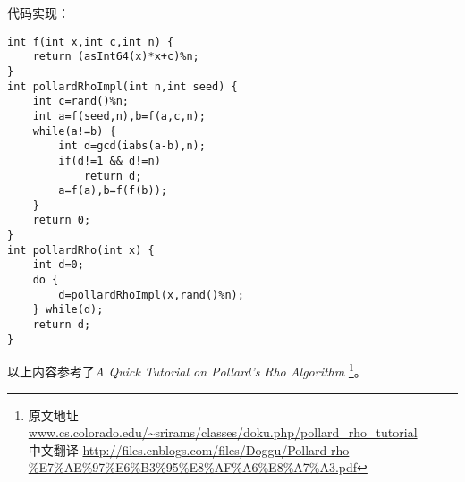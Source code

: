 代码实现：
\begin{lstlisting}[title=Pollard Rho]
int f(int x,int c,int n) {
    return (asInt64(x)*x+c)%n;
}
int pollardRhoImpl(int n,int seed) {
    int c=rand()%n;
    int a=f(seed,n),b=f(a,c,n);
    while(a!=b) {
        int d=gcd(iabs(a-b),n);
        if(d!=1 && d!=n)
            return d;
        a=f(a),b=f(f(b));
    }
    return 0;
}
int pollardRho(int x) {
    int d=0;
    do {
        d=pollardRhoImpl(x,rand()%n);
    } while(d);
    return d;
}
\end{lstlisting}

以上内容参考了\emph{A Quick Tutorial on Pollard's Rho Algorithm}
\footnote{原文地址
\url{www.cs.colorado.edu/~srirams/classes/doku.php/pollard\_rho\_tutorial}
\\中文翻译
\url{http://files.cnblogs.com/files/Doggu/Pollard-rho
\%E7\%AE\%97\%E6\%B3\%95\%E8\%AF\%A6\%E8\%A7\%A3.pdf}
}。
